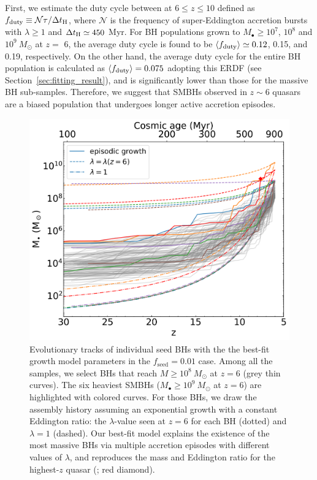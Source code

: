 \documentclass[twocolumn, twocolappendix]{aastex63}
\newcommand{\Msun}{M_\odot}
\newcommand{\tlife}{\tau}
\newcommand{\fseed}{f_\mathrm{seed}}
\begin{document}
\begin{CJK*}{UTF8}{gbsn}
First, we estimate the duty cycle between at $6\leq z\leq 10$ defined as $f_{\rm duty} \equiv \mathcal{N}\tlife/\Delta t_{\rm H}$, 
where $\mathcal{N}$ is the frequency of super-Eddington accretion bursts with $\lambda \geq 1$ and $\Delta t_{\rm H}\simeq 450$ Myr.
For BH populations grown to $M_\bullet \geq10^7$, $10^8$ and $10^9~\Msun$ at $z=$ 6,
the average duty cycle is found to be $\langle f_{\rm duty}\rangle \simeq 0.12$, 0.15, and 0.19, respectively.
On the other hand, the average duty cycle for the entire BH population is calculated as $\langle f_{\rm duty} \rangle =0.075$
adopting this ERDF (see Section~\ref{sec:fitting_result}), and is significantly lower than those for the massive BH sub-samples.
Therefore, we suggest that SMBHs observed in $z\sim 6$ quasars are a biased population
that undergoes longer active accretion episodes.


\begin{figure}
\centering
\includegraphics[width=125mm]{Mevol.png}
\caption{
Evolutionary tracks of individual seed BHs with the the best-fit growth model parameters in the $\fseed=0.01$ case.
Among all the samples, we select BHs that reach $M\geq 10^8~\Msun$ at $z=6$ (grey thin curves). 
The six heaviest SMBHs ($M_\bullet \geq 10^9~\Msun$ at $z=6$) are highlighted with colored curves. 
For those BHs, we draw the assembly history assuming an exponential growth with a constant Eddington ratio: 
the $\lambda$-value seen at $z=6$ for each BH (dotted) and $\lambda =1$ (dashed).
Our best-fit model explains the existence of the most massive BHs via multiple accretion episodes with different values of $\lambda$,
and reproduces the mass and Eddington ratio for the highest-$z$ quasar (\citealt{2021ApJ...907L...1W}; red diamond).
}
\label{fig:Mevol}
\vspace{5mm}
\end{figure}
%
%



\end{CJK*}
\end{document}
